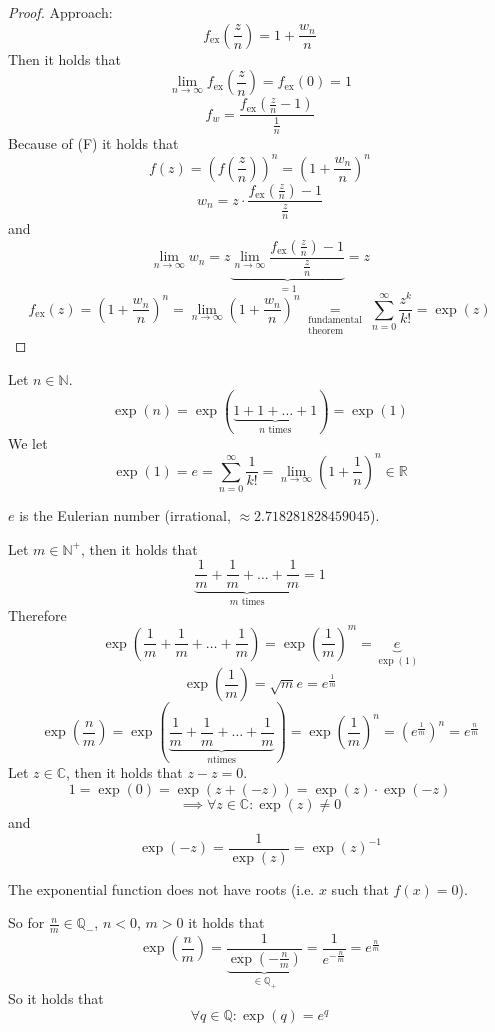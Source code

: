 \documentclass[a4paper,landscape,twocolumn]{article}
\theoremstyle{definition}
\begin{document}
\begin{proof}
  Approach:
  \[ f_{\text{ex}}\left(\frac zn\right) = 1 + \frac{w_n}{n} \]
  Then it holds that
  \[ \lim_{n\to\infty} f_{\text{ex}}\left(\frac zn\right) = f_{\text{ex}}(0) = 1 \]
  \[ f_w = \frac{f_{\text{ex}}\left(\frac zn - 1\right)}{\frac 1n} \]
  Because of (F) it holds that
  \[ f(z) = \left(f\left(\frac zn\right)\right)^n = \left(1 + \frac{w_n}{n}\right)^n \]
  \[ w_n = z \cdot \frac{f_{\text{ex}}\left(\frac zn\right) - 1}{\frac zn} \]
  and
  \[ \lim_{n\to\infty} w_n = z \underbrace{\lim_{n\to\infty} \frac{f_{\text{ex}}\left(\frac zn\right) - 1}{\frac zn}}_{=1} = z \]
  \[
    f_{\text{ex}}(z)
    = \left(1 + \frac{w_n}{n}\right)^n
    = \lim_{n\to\infty} \left(1 + \frac{w_n}{n}\right)^n
    \underset{\substack{\text{fundamental} \\ \text{theorem}}}{=}
    \sum_{n=0}^\infty \frac{z^k}{k!} = \exp(z)
  \]
\end{proof}

Let $n \in \mathbb N$.
\[ \operatorname{exp}(n) = \exp(\underbrace{1 + 1 + \ldots + 1}_{n \text{ times}})
  = \exp(1)
\]
We let
\[
  \exp(1)
  = e
  = \sum_{n=0}^\infty \frac1{k!}
  = \lim_{n\to\infty} \left(1 + \frac1n\right)^n \in \mathbb R
\]

$e$ is the Eulerian number (irrational, $\approx 2.718281828459045$).


Let $m \in \mathbb N^+$, then it holds that
\[ \underbrace{\frac1m + \frac1m + \ldots + \frac1m}_{m \text{ times}} = 1 \]
Therefore
\[
  \exp\left(\frac1m + \frac1m + \ldots + \frac1m\right)
  = \exp\left(\frac1m\right)^m = \underbrace{e}_{\exp(1)}
\]
\[
  \exp\left(\frac1m\right)
  = \sqrt{m}{e} = e^{\frac1m}
\] \[
  \exp\left(\frac nm\right)
  = \exp\left(\underbrace{\frac1m + \frac1m + \ldots + \frac1m}_{n \text{times}}\right)
  = \exp(\frac1m)^n
  = \left(e^{\frac1m}\right)^n
  = e^{\frac nm}
\]
Let $z \in \mathbb C$, then it holds that $z - z = 0$.
\[ 1 = \exp(0) = \exp(z + (-z)) = \exp(z) \cdot \exp(-z) \]
\[ \implies \forall z \in \mathbb C: \exp(z) \neq 0 \]
and
\[ \exp(-z) = \frac1{\exp(z)} = \exp(z)^{-1} \]

The exponential function does not have roots (i.e. $x$ such that $f(x) = 0$).


So for $\frac nm \in \mathbb Q_-$, $n < 0$, $m > 0$ it holds that
\[ \exp(\frac nm) = \frac{1}{\underbrace{\exp(-\frac nm)}_{\in \mathbb Q_+}} = \frac{1}{e^{-\frac nm}}
= e^{\frac nm}
\]
So it holds that
\[ \forall q \in \mathbb Q: \exp(q) = e^q \]
\end{document}
